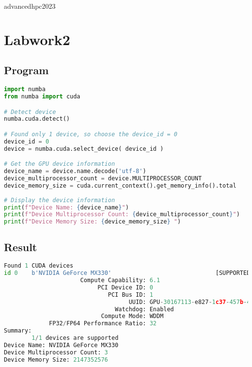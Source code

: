 \documentclass[12pt]{article}
\begin{document}
\begin{center}
    \vspace*{1.8cm}
    \Large
    advancedhpc2023\\
\end{center}
\section{Labwork2}
\subsection{Program}
\begin{lstlisting}[language=Python]
import numba
from numba import cuda

# Detect device
numba.cuda.detect()

# Found only 1 device, so choose the device_id = 0 
device_id = 0 
device = numba.cuda.select_device( device_id )

# Get the GPU device information
device_name = device.name.decode('utf-8')
device_multiprocessor_count = device.MULTIPROCESSOR_COUNT
device_memory_size = cuda.current_context().get_memory_info().total
   
# Display the device information
print(f"Device Name: {device_name}")
print(f"Device Multiprocessor Count: {device_multiprocessor_count}")
print(f"Device Memory Size: {device_memory_size} ")
\end{lstlisting}

\subsection{Result}

\begin{lstlisting}[language=Python]
Found 1 CUDA devices
id 0    b'NVIDIA GeForce MX330'                              [SUPPORTED]
                      Compute Capability: 6.1
                           PCI Device ID: 0
                              PCI Bus ID: 1
                                    UUID: GPU-30167113-e827-1c37-457b-4534b11dd5f7
                                Watchdog: Enabled
                            Compute Mode: WDDM
             FP32/FP64 Performance Ratio: 32
Summary:
        1/1 devices are supported
Device Name: NVIDIA GeForce MX330
Device Multiprocessor Count: 3
Device Memory Size: 2147352576
\end{lstlisting}
\end{document}
